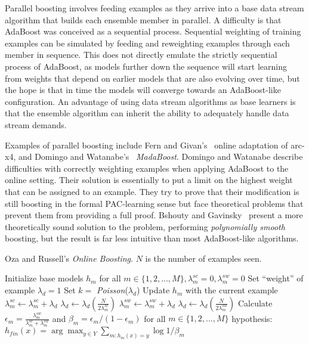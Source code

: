 Parallel boosting involves feeding examples as they arrive into a base data stream algorithm that builds each ensemble member in parallel. A difficulty is that AdaBoost was conceived as a sequential process. Sequential weighting of training examples can be simulated by feeding and reweighting examples through each member in sequence. This does not directly emulate the
strictly sequential process of AdaBoost, as models further down the
sequence will start learning from weights that depend on earlier models
that are also evolving over time, but the hope is that in time the
models will converge towards an AdaBoost-like configuration. An advantage
of using data stream algorithms as base learners is that the ensemble
algorithm can inherit the ability to adequately handle data stream demands.

Examples of parallel boosting include Fern and Givan's~\cite{branchpred} online adaptation of arc-x4, and Domingo and Watanabe's~\cite{madaboost} {\em MadaBoost}. Domingo and Watanabe describe difficulties with correctly weighting examples when applying AdaBoost to the online setting. Their solution is essentially to put a limit on the highest weight that can be assigned to an example. They try to prove that their modification is still boosting in the formal PAC-learning sense but face theoretical problems that prevent them from providing a full proof. Bshouty and Gavinsky~\cite{polyboost} present a more theoretically sound solution to the problem, performing {\em polynomially smooth} boosting, but the result is far less intuitive than most AdaBoost-like algorithms.

\begin{algorithm}
\caption{Oza and Russell's {\em Online Boosting}. $N$ is the number of examples seen.}
\begin{algorithmic}[1]
\STATE Initialize base models $h_{m}$ for all $m \in \{1,2,...,M\}, \lambda_{m}^{sc}=0, \lambda_{m}^{sw}=0$
\STATE Set ``weight'' of example $\lambda_{d} = 1$
\STATE Set $k = $ {\em Poisson}($\lambda_{d}$)
\STATE Update $h_{m}$ with the current example
\ENDFOR
{}
\STATE $\lambda_{m}^{sc} \gets \lambda_{m}^{sc} + \lambda_{d}$
\STATE $\lambda_{d} \gets \lambda_{d} \left( \frac{N}{2 \lambda_{m}^{sc}} \right)$
\ELSE
\STATE $\lambda_{m}^{sw} \gets \lambda_{m}^{sw} + \lambda_{d}$
\STATE $\lambda_{d} \gets \lambda_{d} \left( \frac{N}{2 \lambda_{m}^{sw}} \right)$
\ENDIF
\ENDFOR
\ENDFOR
{}
\STATE Calculate $\epsilon_{m} = \frac{\lambda_{m}^{sw}}{\lambda_{m}^{sc} + \lambda_{m}^{sw}}$ and $\beta_{m} = \epsilon_{m} / (1 - \epsilon_{m})$ for all $m \in \{1,2,...,M\}$
\RETURN hypothesis: $h_{fin}(x) = \arg \max_{y \in Y} \sum_{m:h_{m}(x)=y} \log 1 / \beta_{m}$
\end{algorithmic}
\label{alg:ozaboost}
\end{algorithm}

